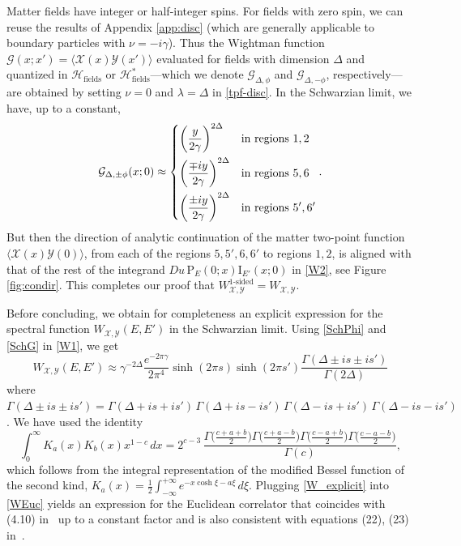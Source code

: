 \documentclass[12pt]{article}
\newcommand{\be}{\begin{equation}}
\newcommand{\ee}{\end{equation}}
\newcommand{\lt}{\left}
\newcommand{\rt}{\right}
\newcommand*{\corr}[1]{\langle{#1}\rangle}
\newcommand{\calG}{\mathcal{G}}
\newcommand{\calH}{\mathcal{H}}
\newcommand{\calX}{\mathcal{X}}
\newcommand{\calY}{\mathcal{Y}}
\newcommand{\Rho}{\mathrm{P}}
\newcommand{\Iota}{\mathrm{I}}
\newcommand{\ga}{\gamma}
\newcommand{\De}{\Delta}
\newcommand{\ov}{\over}
\begin{document}
Matter fields have integer or half-integer spins. For fields with zero spin, we can reuse the results of Appendix \ref{app:disc} (which are generally applicable to boundary particles with $\nu=-i\gamma$). Thus the Wightman function $\calG(x;x')=\corr{\calX(x)\calY(x')}$ evaluated for fields with dimension $\Delta$ and quantized in $\calH_{\text{fields}}$ or $\calH_{\text{fields}}^*$---which we denote $\calG_{\Delta, \phi}$ and $\calG_{\Delta, -\phi}$, respectively---are obtained by setting $\nu=0$ and $\lambda=\Delta$ in \eqref{tpf-disc}. In the Schwarzian limit, we have, up to a constant,
\be\label{SchG}
\calG_{\De,\pm \phi}(x;0) \approx \begin{dcases}
\lt( {y \ov 2 \ga}\rt)^{2\De} & \text{in regions $1,2$} \\
\lt( {\mp i y \ov 2 \ga}\rt)^{2\De} & \text{in regions $5,6$}\\
\lt( {\pm i y \ov 2 \ga}\rt)^{2\De} & \text{in regions $5',6'$}
\end{dcases}.
\ee
But then the direction of analytic continuation of the matter two-point function $\corr{\calX(x)\calY(0)}$, from each of the regions $5,5', 6,6'$ to regions $1,2$, is aligned with that of the rest of the integrand $Du\,\Rho_{E}(0;x)\Iota_{E'}(x;0)$ in \eqref{W2}, see Figure \ref{fig:condir}. This completes our proof that $W^{\text{1-sided}}_{\calX, \calY}=W_{\calX, \calY}$.

Before concluding, we obtain for completeness an explicit expression for the spectral function $W_{\calX, \calY}(E,E')$ in the Schwarzian limit. Using \eqref{SchPhi} and \eqref{SchG} in \eqref{W1}, we get
\begin{equation}\label{W_explicit}
W_{\calX, \calY}(E,E')\approx \gamma^{-2\Delta}\frac{e^{-2\pi\gamma}}{2\pi^4}
\sinh(2\pi s)\sinh(2\pi s')
\frac{\Gamma(\Delta\pm is\pm is')}{\Gamma(2\Delta)}
\end{equation}
where $\Gamma(\Delta\pm is\pm is') =\Gamma(\Delta+is+is')\,\Gamma(\Delta+is-is')\, \Gamma(\Delta-is+is')\,\Gamma(\Delta-is-is')$. We have used the identity
\begin{equation}
\int_{0}^{\infty}K_a(x)K_b(x)x^{1-c}\,dx =2^{c-3}\,
\frac{\Gamma\bigl(\frac{c+a+b}{2}\bigr)\Gamma\bigl(\frac{c+a-b}{2}\bigr)
\Gamma\bigl(\frac{c-a+b}{2}\bigr)\Gamma\bigl(\frac{c-a-b}{2}\bigr)}
{\Gamma(c)},
\end{equation}
which follows from the integral representation of the modified Bessel function of the second kind, $K_a(x)=\frac{1}{2}\int_{-\infty}^{+\infty}e^{-x\cosh\xi-a\xi}\,d\xi$. Plugging \eqref{W_explicit} into \eqref{WEuc} yields an expression for the Euclidean correlator that coincides with (4.10) in~\cite{MeTuVe17} up to a constant factor and is also consistent with equations (22), (23) in~\cite{BaAlKa16}.
\end{document}
